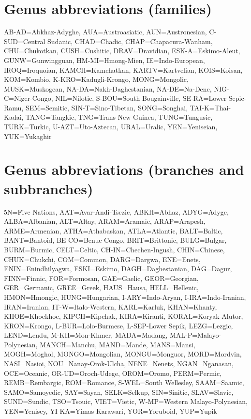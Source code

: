

\section{Genus abbreviations (families)}
\begin{flushleft}
AB-AD=Abkhaz-Adyghe, AUA=Austroasiatic, AUN=Austronesian, C-SUD=Central Sudanic, CHAD=Chadic, CHAP=Chapacura-Wanham, CHU=Chukotkan, CUSH=Cushitic, DRAV=Dravidian, ESK-A=Eskimo-Aleut, GUNW=Gunwingguan, HM-MI=Hmong-Mien, IE=Indo-European, IROQ=Iroquoian, KAMCH=Kamchatkan, KARTV=Kartvelian, KOIS=Koisan, KOM=Kombio, K-KRO=Kadugli-Krongo, MONG=Mongolic, MUSK=Muskogean, NA-DA=Nakh-Daghestanian, NA-DE=Na-Dene, NIG-C=Niger-Congo, NIL=Nilotic, S-BOU=South Bougainville, SE-RA=Lower Sepic-Ramu, SEM=Semitic, SIN-T=Sino-Tibetan, SONG=Songhai, TAI-K=Thai-Kadai, TANG=Tangkic, TNG=Trans New Guinea, TUNG=Tungusic, TURK=Turkic, U-AZT=Uto-Aztecan, URAL=Uralic, YEN=Yeniseian, YUK=Yukaghir
\end{flushleft}

\section{Genus abbreviations (branches and subbranches)}
\begin{flushleft}
5N=Five Nations, AAT=Avar-Andi-Tsezic, ABKH=Abhaz, ADYG=Adyge, ALBA=Albanian, ALT=Altay, ARAM=Aramaic, ARAP=Arapesh, ARME=Armenian, ATHA=Athabaskan, ATLA=Atlantic, BALT=Baltic, BANT=Bantoid, BE-CO=Benue-Congo, BRIT=Brittonic, BULG=Bulgar, BURM=Burmic, CELT=Celtic, CH-IN=Chechen-Ingush, CHIN=Chinese, CHUK=Chukchi, COM=Common, DARG=Dargwa, ENE=Enets, ENIN=Enindhilyagwa, ESKI=Eskimo, DAGH=Daghestanian, DAG=Dagur, FINN=Finnic, FOR=Formosan, GAE=Gaelic, GEOR=Georgian, GER=Germanic, GREE=Greek, HAUS=Hausa, HELL=Hellenic, HMON=Hmongic, HUNG=Hungarian, I-ARY=Indo-Aryan, I-IRA=Indo-Iranian, IRAN=Iranian, IT-W=Italo-Western, KARL=Karluk, KHAN=Khanty, KHOE=Khoekhoe, KIPCH=Kipchak, KIRA=Kiranti, KORAL=Koryak-Alutor, KRON=Krongo, L-BUR=Lolo-Burmese, L-SEP-Lower Sepik, LEZG=Lezgic, LEND=Lendu, M-KH=Mon-Khmer, MADA=Madang, MAL-P=Malayo-Polynesian, MANCH=Manchu, MAND=Mande, MANS=Mansi, MOGH=Moghol, MONGO=Mongolian, MONGU=Monguor, MORD=Mordvin, NASI=Nasioi, NOU=Nanay-Orok-Ulcha, NENE=Nenets, NGAN=Nganasan, OCE=Oceanic, OR-UD=Oroch-Udege, OROM=Oromo, PERM=Permic,  REMB=Rembargic, ROM=Romance, S-WEL=South Wellesley, SAAM=Saamic, SAMO=Samoyedic, SAY=Sayan, SELK=Selkup, SIN=Sinitic, SLAV=Slavic, SUND=Sundic, TSO=Tsouic, VIET=Vietic, W-MP=Western Malayo-Polynesian, YEN=Yenisey, YI-KA=Yimas-Karawari, YOR=Yoruboid, YUP=Yupik
\end{flushleft}

